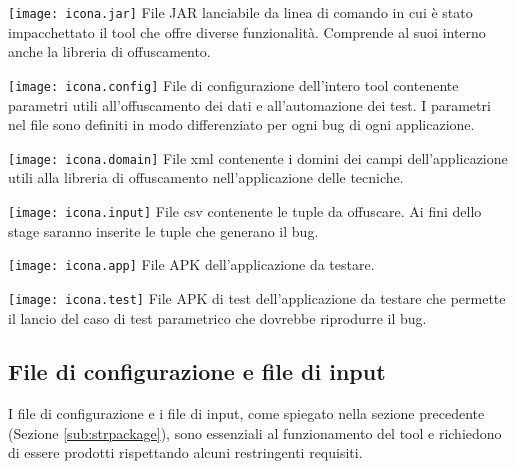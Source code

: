 \begin{tcolorbox} [colback=white, colframe=lightgray]
 	\texttt{[image: icona.jar]} \newline
File JAR lanciabile da linea di comando in cui è stato impacchettato il tool che offre diverse funzionalità. Comprende al suoi interno anche la libreria di offuscamento.
\end{tcolorbox}
	
\begin{tcolorbox}[colback=white, colframe=lightgray]
	 \texttt{[image: icona.config]} \newline
File di configurazione dell'intero tool contenente parametri utili all'offuscamento dei dati e all'automazione dei test. I parametri nel file sono definiti in modo differenziato per ogni bug di ogni applicazione. 
\end{tcolorbox}

\begin{tcolorbox}[colback=white, colframe=lightgray]
	 \texttt{[image: icona.domain]} \newline
File xml contenente i domini dei campi dell'applicazione utili alla libreria di offuscamento nell'applicazione delle tecniche.
\end{tcolorbox}

\begin{tcolorbox}[colback=white, colframe=lightgray]
	 \texttt{[image: icona.input]} \newline
File csv contenente le tuple da offuscare. Ai fini dello stage saranno inserite le tuple che generano il bug.
\end{tcolorbox}

\begin{tcolorbox}[colback=white, colframe=lightgray]
	 \texttt{[image: icona.app]} \newline
File APK dell'applicazione da testare.
\end{tcolorbox}

\begin{tcolorbox}[colback=white, colframe=lightgray]
	 \texttt{[image: icona.test]} \newline
File APK di test dell'applicazione da testare che permette il lancio del caso di test parametrico che dovrebbe riprodurre il bug.
\end{tcolorbox}

\subsection{File di configurazione e file di input}
\label{fileconfigfileinput}
I file di configurazione e i file di input, come spiegato nella sezione precedente (Sezione \ref{sub:strpackage}), sono essenziali al funzionamento del tool e richiedono di essere prodotti rispettando alcuni restringenti requisiti.  

